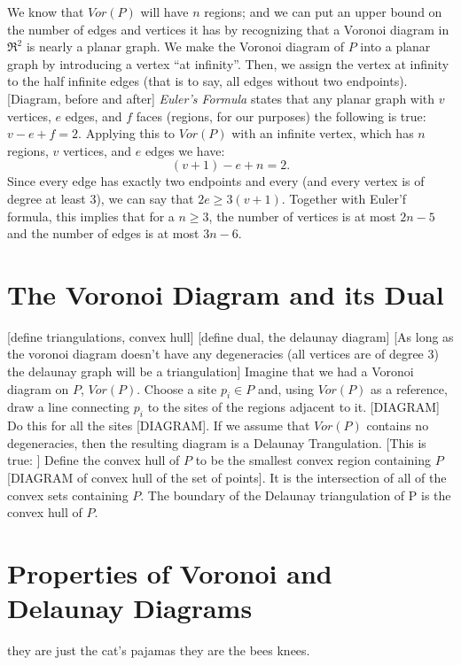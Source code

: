 \documentclass[12pt,twoside]{reedthesis}
\begin{document}
  We know that $Vor(P)$ will have $n$ regions; and we can put an upper bound on the number of edges and vertices it has by recognizing that a Voronoi diagram in $\Re^2$ is nearly a planar graph. We make the Voronoi diagram of $P$ into a planar graph by introducing a vertex ``at infinity''. Then, we assign the vertex at infinity to the half infinite edges (that is to say, all edges without two endpoints). [Diagram, before and after] \textit{Euler's Formula} states that any planar graph with $v$ vertices, $e$ edges, and $f$ faces (regions, for our purposes) the following is true:
  $v - e + f = 2.$ Applying this to $Vor(P)$ with an infinite vertex, which has $n$ regions, $v$ vertices, and $e$ edges we have:
  $$(v + 1) - e + n = 2.$$ Since every edge has exactly two endpoints and every (and every vertex is of degree at least 3), we can say that $2e \geq 3(v + 1)$. Together with Euler'f formula, this implies that for a $n\geq 3$, the number of vertices is at most $2n -5$ and the number of edges is at most $3n -6$. 
  
  \section{The Voronoi Diagram and its Dual} %
  \label{sec:the_voronoi_diagram_and_its_dual}
  [define triangulations, convex hull]
  [define dual, the delaunay diagram]
  [As long as the voronoi diagram doesn't have any degeneracies (all vertices are of degree 3) the delaunay graph will be a triangulation]
  Imagine that we had a Voronoi diagram on $P$, $Vor(P)$. Choose a site $p_{i} \in P$ and, using $Vor(P)$ as a reference, draw a line connecting $p_{i}$ to the sites of the regions adjacent to it. [DIAGRAM] Do this for all the sites [DIAGRAM]. If we assume that $Vor(P)$ contains no degeneracies, then the resulting diagram is a Delaunay Trangulation. 
  [This is true: ] Define the convex hull of $P$ to be the smallest convex region containing $P$ [DIAGRAM of convex hull of the set of points]. It is the intersection of all of the convex sets containing $P$. The boundary of the Delaunay triangulation of P is the convex hull of $P$.

  
  \section{Properties of Voronoi and Delaunay Diagrams} %
  \label{sec:properties_of_voronoi_and_delaunay_diagrams}
  they are just the cat's pajamas they are the bees knees. 
  
\end{document}
